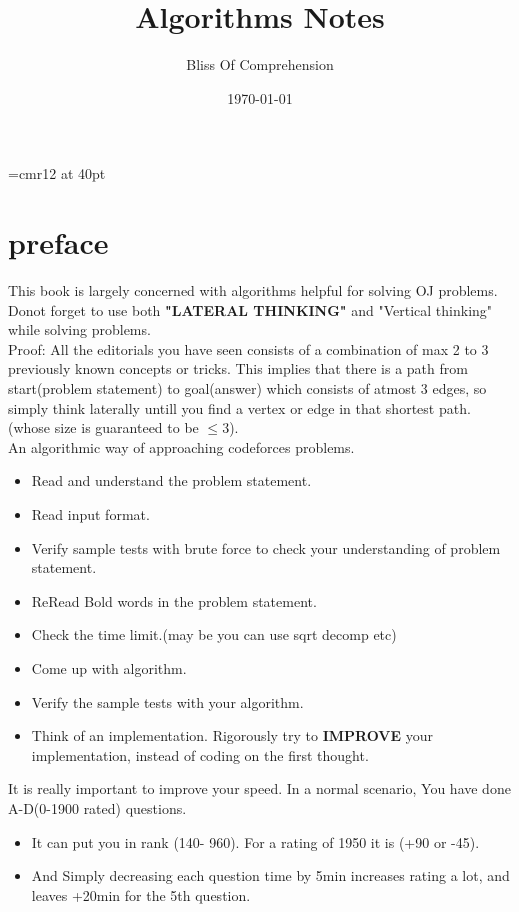 \documentclass[a4paper,12pt]{report}
\begin{document}
\font\TitleF=cmr12 at 40pt
\title{\TitleF Algorithms Notes}
\author{Bliss Of Comprehension}
\date{\today}
\maketitle

\tableofcontents

\chapter*{preface}

This book is largely concerned with algorithms helpful for solving OJ problems.\\

Donot forget to use both \textbf{"LATERAL THINKING"} and "Vertical thinking" while solving problems.\\
Proof: All the editorials you have seen consists of a combination of max  2 to 3 previously known concepts or tricks. This implies that there is a path from start(problem statement) to goal(answer) which consists of atmost 3 edges, so simply think laterally untill you find a vertex or edge in that shortest path. (whose size is guaranteed to be $\leq 3$).\\ 


An algorithmic way of approaching codeforces problems.
\begin{itemize}
	\item Read and understand the problem statement.
	\item Read input format.
	\item Verify sample tests with brute force to check your understanding of problem statement.
	\item ReRead Bold words in the problem statement.
	\item Check the time limit.(may be you can use sqrt decomp etc)
	\item Come up with algorithm.
	\item Verify the sample tests with your algorithm.
	\item Think of an implementation. Rigorously try to \textbf{IMPROVE} your implementation, instead of coding on the first thought. 
\end{itemize}

It is really important to improve your speed. In a normal scenario, You have done A-D(0-1900 rated) questions.
\begin{itemize}
	\item  It can put you in rank (140- 960). For a rating of 1950 it is 
	(+90 or -45).
	\item And Simply decreasing each question time by 5min increases rating a lot, and leaves +20min for the 5th question.
\end{itemize}
\end{document}
